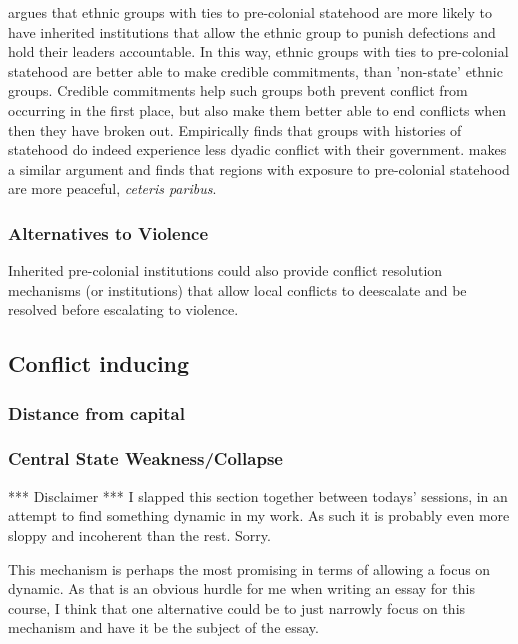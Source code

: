 \documentclass[12pt]{article}
\begin{document}
\citet{Wig2016} argues that ethnic groups with ties to pre-colonial statehood
are more likely to have inherited institutions that allow the ethnic group to
punish defections and hold their leaders accountable.  In this way, ethnic
groups with ties to pre-colonial statehood are better able to make credible
commitments, than 'non-state' ethnic groups.  Credible commitments help such
groups both prevent conflict from occurring in the first place, but also make
them better able to end conflicts when then they have broken out.  Empirically
\citet{Wig2016} finds that groups with histories of statehood do indeed
experience less dyadic conflict with their government.
\citet{Depetris-Chauvin2016} makes a similar argument and finds that regions
with exposure to pre-colonial statehood are more peaceful, \textit{ceteris
paribus}.

\subsubsection{Alternatives to Violence}

Inherited pre-colonial institutions could also provide conflict resolution
mechanisms (or institutions) that allow local conflicts to deescalate and be
resolved before escalating to violence. 


\subsection{Conflict inducing}

\subsubsection{Distance from capital}

\subsubsection{Central State Weakness/Collapse}

*** Disclaimer *** I slapped this section together between todays' sessions, in
an attempt to find something dynamic in my work. As such it is probably even
more sloppy and incoherent than the rest. Sorry.

This mechanism is perhaps the most promising in terms of allowing a focus on
dynamic. As that is an obvious hurdle for me when writing an essay for this
course, I think that one alternative could be to just narrowly focus on this
mechanism and have it be the subject of the essay.
\end{document}
